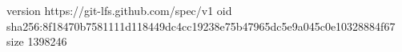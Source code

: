 version https://git-lfs.github.com/spec/v1
oid sha256:8f18470b7581111d118449dc4cc19238e75b47965dc5e9a045c0e10328884f67
size 1398246
